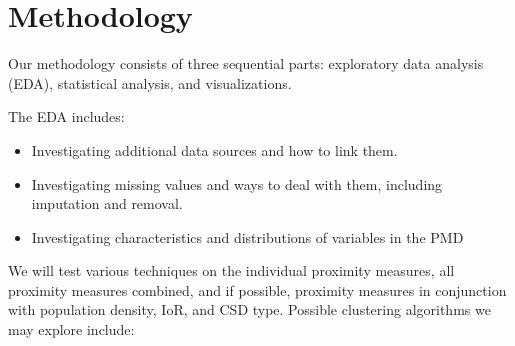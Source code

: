 \documentclass[11pt, a4paper]{article}
\newcommand{\comment}[1]{}
\begin{document}
\section*{Methodology}

\comment{
\subsection*{Data Investigation}
\subsection*{Statistical Analysis}
\subsection*{Visualization}
}

Our methodology consists of three sequential parts: exploratory data analysis (EDA), statistical analysis, and visualizations.
\par
The EDA includes:
\begin{itemize}
\item Investigating additional data sources and how to link them. 
\item Investigating missing values and ways to deal with them, including imputation and removal.
\item  Investigating characteristics and distributions of variables in the PMD 
\end{itemize}

We will test various techniques on the individual proximity measures, all proximity measures combined, and if possible, proximity measures in conjunction with population density, IoR, and CSD type. Possible clustering algorithms we may explore include:
\end{document}
